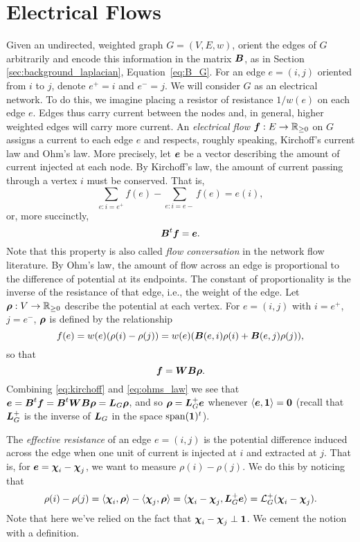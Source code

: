 \section{Electrical Flows}
\label{sec:background_er}
Given an undirected, weighted graph $G=(V,E,w)$, orient the edges of $G$ arbitrarily and encode this information in the matrix $\vb*{B}$, as in Section \ref{sec:background_laplacian}, Equation~\eqref{eq:B_G}. For an edge $e=(i,j)$ oriented from $i$ to $j$, denote $e^+=i$ and $e^-=j$. 
We will consider $G$ as an electrical network. To do this, we imagine placing a resistor of resistance $1/w(e)$ on each edge $e$. Edges thus carry current between the nodes and, in general, higher weighted edges will carry more current.  
An \emph{electrical flow $\vb*{f}:E\to\mathbb{R}_{\geq 0}$} on $G$ assigns a current to each edge $e$ and respects, roughly speaking, Kirchoff's current law and Ohm's law. More precisely, let $\vb*{e}$ be a vector describing the amount of current injected at each node. By Kirchoff's law, the amount of current passing through a vertex $i$ must be conserved. That is, 
\[\sum_{e:i=e^+}f(e) - \sum_{e:i=e-}f(e) = e(i),\]
or, more succinctly, 
\begin{equation}
\label{eq:kirchoff}
\vb*{B}^t \vb*{f}=\vb*{e}. 
\end{equation}
Note that this property is also called \emph{flow conversation} in the network flow literature. 
By Ohm's law, the amount of flow across an edge is proportional to the difference of potential at its endpoints. The constant of proportionality is the inverse of the resistance of that edge, i.e., the weight of the edge. Let $\vb*{\rho}:V\to\mathbb{R}_{\geq 0}$ describe the potential at each vertex. For $e=(i,j)$ with $i=e^+$, $j=e^-$, $\vb*{\rho}$ is defined by the relationship 
\begin{equation*}
f(e) = w(e)(\rho(i)-\rho(j)) = w(e) (\vb*{B}(e,i)\rho(i) + \vb*{B}(e,j)\rho(j)),
\end{equation*}
so that
\begin{equation}
\label{eq:ohms_law}
\vb*{f}=\vb*{W}\vb*{B}\vb*{\rho}.
\end{equation}
Combining \eqref{eq:kirchoff} and \eqref{eq:ohms_law} we see that $\vb*{e}=\vb*{B}^t \vb*{f}=\vb*{B}^t \vb*{W}\vb*{B} \vb*{\rho} = \vb*{L}_G\vb*{\rho}$, and so $\vb*{\rho} = \vb*{L}_G^+\vb*{e}$ whenever $\langle \vb*{e},\vb{1}\rangle=\vb{0}$ (recall that $\vb*{L}_G^+$ is the inverse of $\vb*{L}_G$ in the space $\textnormal{span}(\vb{1})^t$).  

The \emph{effective resistance} of an edge $e=(i,j)$ is the potential difference induced across the edge when one unit of current is injected at $i$ and extracted at $j$. That is, for $\vb*{e}=\boldsymbol{\chi}_i-\boldsymbol{\chi}_j$, we want to measure $\rho(i)-\rho(j)$. We do this by noticing that 
\[\rho(i)-\rho(j) = \langle \boldsymbol{\chi}_i,\vb*{\rho}\rangle - \langle \boldsymbol{\chi}_j,\vb*{\rho}\rangle = \langle \boldsymbol{\chi}_i-\boldsymbol{\chi}_j,\vb*{L}_G^+\vb*{e}\rangle=\mathcal{L}_G^+(\boldsymbol{\chi}_i-\boldsymbol{\chi}_j).\]
Note that here we've relied on the fact that $\boldsymbol{\chi}_i-\boldsymbol{\chi}_j\perp \vb{1}$. We cement the notion with a definition. 

